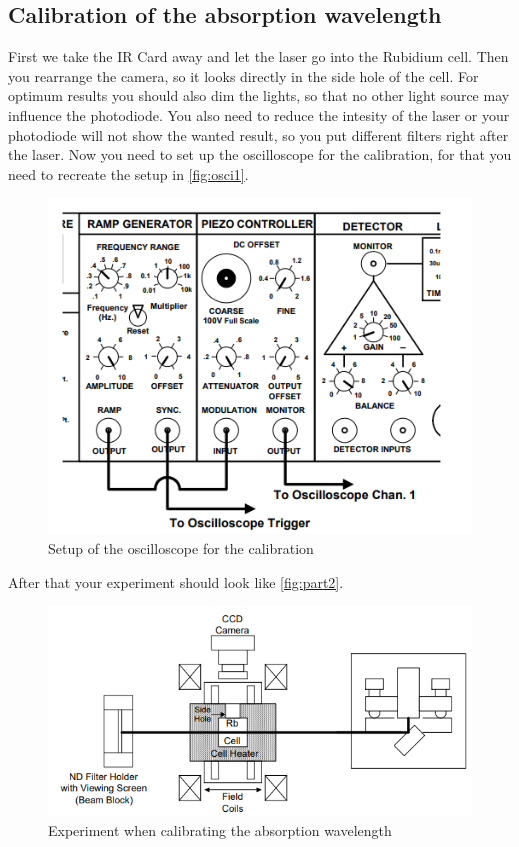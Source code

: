 \subsection{Calibration of the absorption wavelength}
\label{ssec:exe2}

First we take the IR Card away and let the laser go into the Rubidium cell. 
Then you rearrange the camera, so it looks directly in the side hole of the cell. 
For optimum results you should also dim the lights, so that no other light source may influence the photodiode.
You also need to reduce the intesity of the laser or your photodiode will not show the wanted result, so you put different filters right after the laser.
Now you need to set up the oscilloscope for the calibration, for that you need to recreate the setup in \autoref{fig:osci1}.
\begin{figure}
    \centering
    \includegraphics[width=\textwidth]{images/generator.png}
    \caption{Setup of the oscilloscope for the calibration \cite{V60}}
    \label{fig:osci1}
\end{figure}
After that your experiment should look like \autoref{fig:part2}.
\begin{figure}
    \centering
    \includegraphics[width=\textwidth]{images/part2.png}
    \caption{Experiment when calibrating the absorption wavelength \cite{V60}}
    \label{fig:part2}
\end{figure}
